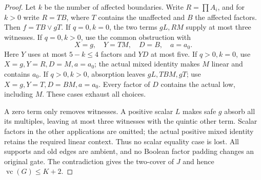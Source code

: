 \documentclass[11pt]{article}
\newcommand{\vc}{\operatorname{vc}}
\theoremstyle{definition}
\theoremstyle{remark}
\begin{document}
\begin{proof}
Let $k$ be the number of affected boundaries. Write $R=\prod A_i$, and for $k>0$ write $R=TB$, where $T$ contains the unaffected and $B$ the affected factors. Then $f=TB\vee gT$. If $q=0,k=0$, the two terms $gL,RM$ supply at most three witnesses. If $q=0,k>0$, use the common obstruction with
\[
 X=g,\quad Y=TM,\quad D=B,\quad a=a_0.
\]
Here $Y$ uses at most $5-k\le4$ factors and $YD$ at most five. If $q>0,k=0$, use $X=g,Y=R,D=M,a=a_0$; the actual mixed identity makes $M$ linear and contains $a_0$. If $q>0,k>0$, absorption leaves $gL,TBM,gT$; use $X=g,Y=T,D=BM,a=a_0$. Every factor of $D$ contains the actual low, including $M$. These cases exhaust all choices.

A zero term only removes witnesses. A positive scalar $L$ makes safe $g$ absorb all its multiples, leaving at most three witnesses with the quintic other term. Scalar factors in the other applications are omitted; the actual positive mixed identity retains the required linear context. Thus no scalar equality case is lost. All supports and old edges are ambient, and no Boolean factor padding changes an original gate. The contradiction gives the two-cover of $J$ and hence $\vc(G)\le K+2$.
\end{proof}
\end{document}
